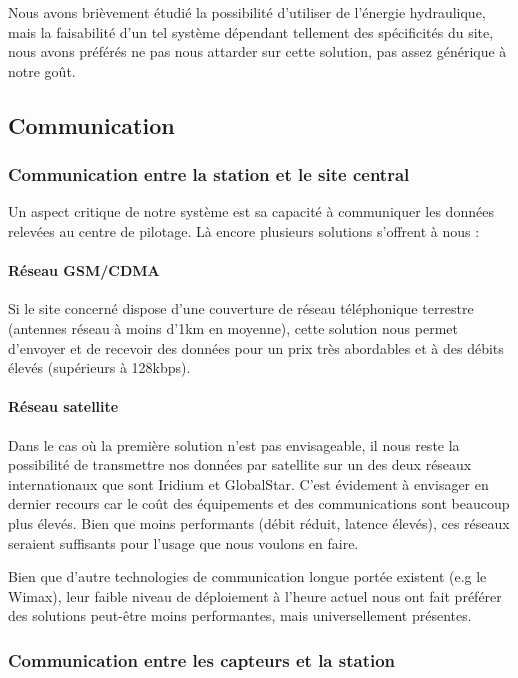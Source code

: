 Nous avons brièvement étudié la possibilité d’utiliser de l’énergie hydraulique, mais la faisabilité d’un tel système dépendant tellement des spécificités du site, nous avons préférés ne pas nous attarder sur cette solution, pas assez générique à notre goût.

\subsection{Communication}

\subsubsection{Communication entre la station et le site central}

Un aspect critique de notre système est sa capacité à communiquer les données relevées au centre de pilotage. Là encore plusieurs solutions s’offrent à nous :

\paragraph{Réseau GSM/CDMA}

Si le site concerné dispose d’une couverture de réseau téléphonique terrestre (antennes réseau à moins d’1km en moyenne), cette solution nous permet d’envoyer et de recevoir des données pour un prix très abordables et à des débits élevés (supérieurs à 128kbps).

\paragraph{Réseau satellite}

Dans le cas où la première solution n’est pas envisageable, il nous reste la possibilité de transmettre nos données par satellite sur un des deux réseaux internationaux que sont Iridium et GlobalStar. C’est évidement à envisager en dernier recours car le coût des équipements et des communications sont beaucoup plus élevés. Bien que moins performants (débit réduit, latence élevés), ces réseaux seraient suffisants pour l’usage que nous voulons en faire.

Bien que d’autre technologies de communication longue portée existent (e.g le Wimax), leur faible niveau de déploiement à l’heure actuel nous ont fait préférer des solutions peut-être moins performantes, mais universellement présentes.

\subsubsection{Communication entre les capteurs et la station}

